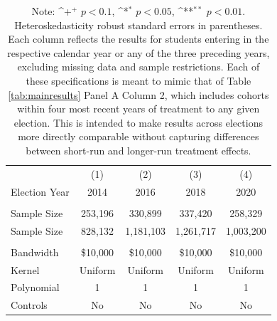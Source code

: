 \documentclass[12pt,letterpaper,oneside]{book}
\newcommand{\basepath}{g:/My Drive/Grad School}
\newcommand{\basepath}{basepath}
\begin{document}
\clearpage


\begin{table}[h!]\centering
    \def\sym#1{\ifmmode^{#1}\else\(^{#1}\)\fi}
    \caption{Impacts of Cal Grants and Pell Grants by Election\label{tab:elexovertime}}
    \begin{tabular}{l*{4}{c}}
        \hline\hline
        &\multicolumn{1}{c}{(1)}&\multicolumn{1}{c}{(2)}&\multicolumn{1}{c}{(3)}&\multicolumn{1}{c}{(4)}\\
        Election Year&\multicolumn{1}{c}{2014}&\multicolumn{1}{c}{2016}&\multicolumn{1}{c}{2018}&\multicolumn{1}{c}{2020}\\
        \hline
        &&&&\\

        
        Sample Size      &       253,196     &      330,899      &   337,420   &   258,329      \\[0.75em]


        
        Sample Size      &     828,132     &     1,181,103     &   1,261,717    &   1,003,200        \\


        &&&&\\

        \hline
        Bandwidth & \$10,000       &   \$10,000        &   \$10,000        &   \$10,000            \\
        Kernel&   Uniform      &   Uniform        &   Uniform        &   Uniform            \\
        Polynomial&   1       &   1        &  1        &   1            \\
        Controls&   No       &   No        &   No        &   No               \\

        \hline
    \end{tabular}
    \caption*{\footnotesize Note: \sym{+} \(p<0.1\), \sym{*} \(p<0.05\), \sym{**} \(p<0.01\). Heteroskedasticity robust standard errors in parentheses. Each column reflects the results for students entering in the respective calendar year or any of the three preceding years, excluding missing data and sample restrictions. Each of these specifications is meant to mimic that of Table \ref{tab:mainresults} Panel A Column 2, which includes cohorts within four most recent years of treatment to any given election. This is intended to make results across elections more directly comparable without capturing differences between short-run and longer-run treatment effects.}
\end{table}
\end{document}
